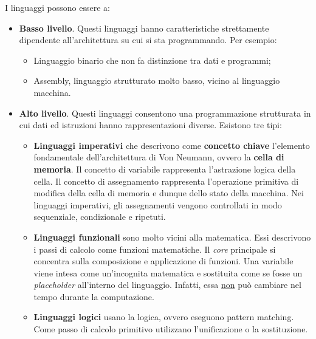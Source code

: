 \documentclass[a4paper]{article}
\begin{document}
	I linguaggi possono essere a:
	\begin{itemize}
		\item \textcolor{Red3}{\textbf{Basso livello}}. Questi linguaggi hanno caratteristiche strettamente dipendente all'architettura su cui si sta programmando. Per esempio:
		\begin{itemize}
			\item Linguaggio binario che non fa distinzione tra dati e programmi;

			\item Assembly, linguaggio strutturato molto basso, vicino al linguaggio macchina.
		\end{itemize}
	
		\item \textcolor{Red3}{\textbf{Alto livello}}. Questi linguaggi consentono una programmazione strutturata in cui dati ed istruzioni hanno rappresentazioni diverse. Esistono tre tipi:
		\begin{itemize}
			\item \textcolor{Red3}{\textbf{Linguaggi imperativi}} che descrivono come \textbf{concetto chiave} l'elemento fondamentale dell'architettura di Von Neumann, ovvero la \textbf{cella di memoria}.\newline
			Il concetto di variabile rappresenta l'astrazione logica della cella.\newline
			Il concetto di assegnamento rappresenta l'operazione primitiva di modifica della cella di memoria e dunque dello stato della macchina.\newline
			Nei linguaggi imperativi, gli assegnamenti vengono controllati in modo sequenziale, condizionale e ripetuti.
			
			\item \textcolor{Red3}{\textbf{Linguaggi funzionali}} sono molto vicini alla matematica. Essi descrivono i passi di calcolo come funzioni matematiche. Il \emph{core} principale si concentra sulla composizione e applicazione di funzioni.\newline
			Una variabile viene intesa come un'incognita matematica e sostituita come se fosse un \emph{placeholder} all'interno del linguaggio. Infatti, essa \underline{non} può cambiare nel tempo durante la computazione.
			
			\item \textcolor{Red3}{\textbf{Linguaggi logici}} usano la logica, ovvero eseguono pattern matching. Come passo di calcolo primitivo utilizzano l'unificazione o la sostituzione.
		\end{itemize}
	\end{itemize}
	
\end{document}
